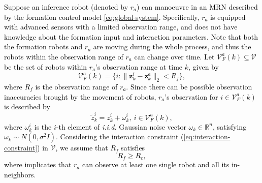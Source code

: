 \documentclass[12pt,journal,draftclsnofoot,onecolumn]{IEEEtran}
\let \sss=\scriptscriptstyle
\begin{document}
\textcolor{black}{
Suppose an inference robot (denoted by $r_a$) can manoeuvre in an MRN described by the formation control model \eqref{eq:global-system}. 
Specifically, $r_a$ is equipped with advanced sensors with a limited observation range, and does not have knowledge about the formation input and interaction parameters. 
Note that both the formation robots and $r_a$ are moving during the whole process, and thus the robots within the observation range of $r_a$ can change over time. 
Let $\mathcal{V}_{\sss F}^{a}(k)\subseteq\mathcal{V}$ be the set of robots within $r_a$'s observation range at time $k$, given by 
\begin{equation}
\mathcal{V}_{\sss F}^{a}(k)=\{ i: \|{\mathbf z}_{k}^{i}-{\mathbf z}_{k}^{a}\|_2 < R_{f} \},
\end{equation} 
where $R_f$ is the observation range of $r_a$. 
Since there can be possible observation inaccuracies brought by the movement of robots, $r_a$'s observation for $i\in\mathcal{V}_{\sss F}^{a}(k)$ is described by 
\begin{equation}
\tilde z_{k}^i=z_{k}^i+\omega_{k}^i,~i\in\mathcal{V}_{\sss F}^{a}(k),
\end{equation}
where $\omega_{k}^i$ is the $i$-th element of \textit{i.i.d.} Gaussian noise vector $\omega_{k}\in\mathbb{R}^{n}$, satisfying $\omega_{k}\sim N(0,{\sigma ^2}I)$. 
Considering the interaction constraint (\ref{eq:interaction-constraint}) in $\mathcal{V}$, we assume that $R_f$ satisfies
\begin{equation}\label{eq:observation-constraint}
R_f\ge R_c,
\end{equation}
where implicates that $r_a$ can observe at least one single robot and all its in-neighbors. }
\end{document}
